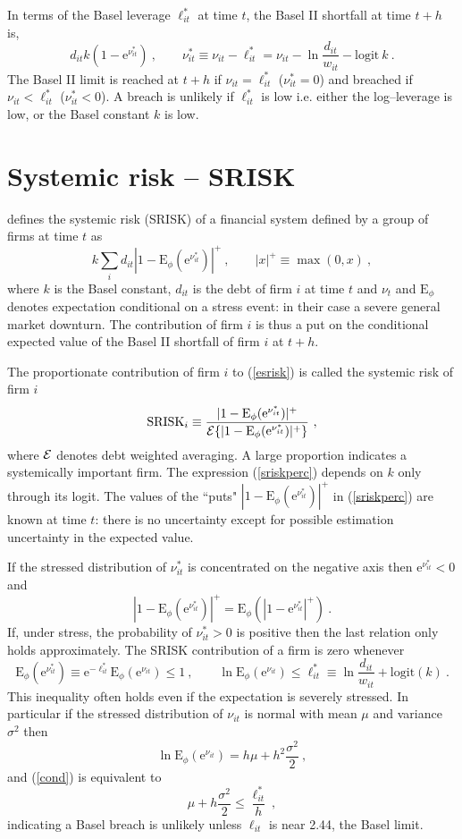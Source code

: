 \documentclass[authoryear]{elsarticle}
\newcommand{\logit}{\mathrm{logit}}
\newcommand{\E}{\mathrm{E}}
\newcommand{\e}{\mathrm{e}}
\newcommand{\Ex}{{\cal E}}
\newcommand{\eref}[1]{(\ref{#1})}
\newcommand{\cq}{\ , \qquad}
\newcommand{\be}[1]{\begin{equation}\label{#1}}
\newcommand{\ee}{\end{equation}}
\begin{document}
In terms of the Basel leverage $\ell_{it}^*$ at time $t$, the  Basel II shortfall  at time $t+h$ is,
\be{bs}
d_{it}k(1-\e^{\nu^*_{it}})\cq \nu_{it}^*\equiv \nu_{it}-\ell^*_{it}=\nu_{it}-\ln\frac{d_{it}}{w_{it}}-\logit\ k\ . 
\ee 
The Basel II limit is reached at $t+h$ if $\nu_{it}=\ell_{it}^*$ ($\nu_{it}^*=0$) and  breached  if
$
\nu_{it}< \ell_{it}^*
$ ($\nu_{it}^*<0$).
A breach is  unlikely if $\ell^*_{it}$ is low i.e. either the log--leverage is low, or the Basel constant $k$ is low.
\newcommand{\Es}{\E_\phi}





\section{Systemic risk -- SRISK}

\cite{brownlees2015} defines the systemic risk (SRISK) of a financial system defined by a group of firms  at time $t$ as
\be{esrisk}
k\sum_i d_{it}|1-\Es(\e^{\nu^*_{it}})|^+  \cq |x|^+\equiv \max(0,x) \ ,
\ee
where $k$ is the Basel constant, $d_{it}$ is the debt of firm $i$ at time $t$ and $\nu_t$  and $\Es$ denotes  expectation conditional on a stress event:  in their case a severe general market downturn.
The contribution of firm $i$ is thus a put on the conditional expected value of the Basel II shortfall of firm $i$ at $t+h$.

 The proportionate contribution of firm $i$  to \eref{esrisk} is called the systemic risk of firm $i$
 \be{sriskperc}
 \mathrm{SRISK}_i\equiv\frac{|1-\Es(\e^{\nu^*_{it}})|^+}{\Ex\{|1-\Es(\e^{\nu^*_{it}})|^+\}}\ , 
 \ee
where $\Ex$ denotes  debt weighted averaging.     A large proportion indicates a systemically important firm.  The  expression \eref{sriskperc} depends on $k$ only through its logit.  The values of the ``puts" $|1-\Es(\e^{\nu^*_{it}})|^+$  in \eref{sriskperc} are known at time $t$:  there is no uncertainty except for possible estimation uncertainty in the expected value.

 If the stressed distribution of $\nu^*_{it} $ is concentrated on the negative axis then  $\e^{\nu^*_{it}}<0$ and
$$
|1-\Es(\e^{\nu^*_{it}})|^+ =\Es(|1-\e^{\nu^*_{it}}|^+)\ .
$$
If, under stress, the probability of $\nu^*_{it}>0$ is positive  then the last relation only holds approximately.   The SRISK contribution of a firm is zero whenever
\be{cond}
\Es(\e^{\nu^*_{it}})\equiv \e^{-\ell_{it}^*}\Es(\e^{\nu_{it}})\le 1\cq \ln \Es(\e^{\nu_{it}})\le\ell^*_{it}\equiv\ln\frac{d_{it}}{w_{it}}+\logit(k)\ .
\ee
This inequality often holds even if the expectation is severely stressed.  In particular if the stressed distribution of $\nu_{it}$ is normal with mean $\mu$ and variance $\sigma^2$ then
$$
\ln \Es(\e^{\nu_{it}}) = h\mu +h^2\frac{\sigma^2}{2}\ ,
$$
and  \eref{cond} is equivalent to
$$
\mu +h\frac{\sigma^2}{2}\le \frac{\ell_{it}^*}{h} \ ,
$$
indicating a Basel breach is unlikely unless $\ell_{it}$ is near 2.44, the Basel limit.
\end{document}
